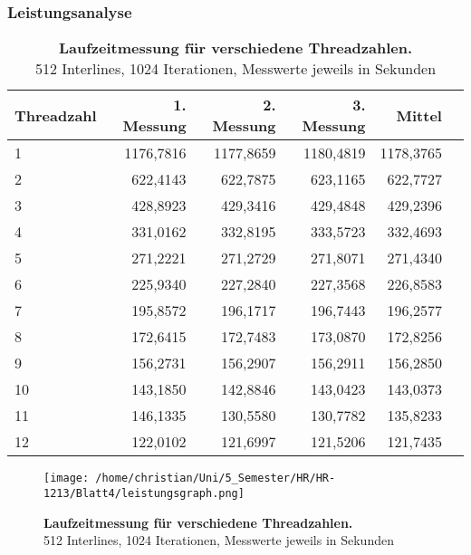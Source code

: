 \documentclass[a4paper,12pt]{scrartcl}
\begin{document}
\subsubsection*{Leistungsanalyse}
\begin{table}[!h]
\begin{tabular}{|l|r|r|r|r|r|}
\hline
Threadzahl&1. Messung&2. Messung&3. Messung&Mittel\\
\hline
1	&1176,7816	&1177,8659	&1180,4819	&1178,3765\\
\hline
2	&622,4143	&622,7875	&623,1165	&622,7727\\
\hline
3	&428,8923	&429,3416	&429,4848	&429,2396\\
\hline
4	&331,0162	&332,8195	&333,5723	&332,4693\\
\hline
5	&271,2221	&271,2729	&271,8071	&271,4340\\
\hline
6	&225,9340	&227,2840	&227,3568	&226,8583\\
\hline
7	&195,8572	&196,1717	&196,7443	&196,2577\\
\hline
8	&172,6415	&172,7483	&173,0870	&172,8256\\
\hline
9	&156,2731	&156,2907	&156,2911	&156,2850\\
\hline
10	&143,1850	&142,8846	&143,0423	&143,0373\\
\hline
11	&146,1335	&130,5580	&130,7782	&135,8233\\
\hline
12	&122,0102	&121,6997	&121,5206	&121,7435\\

\hline
\end{tabular}
\caption{\textbf{Laufzeitmessung für verschiedene Threadzahlen.} \\512 Interlines, 1024 Iterationen, Messwerte jeweils in Sekunden}
\end{table}
\begin{figure}[!h]
\texttt{[image: /home/christian/Uni/5\_Semester/HR/HR-1213/Blatt4/leistungsgraph.png]}
\caption{\textbf{Laufzeitmessung für verschiedene Threadzahlen.} \\512 Interlines, 1024 Iterationen, Messwerte jeweils in Sekunden}
\end{figure}
\end{document}
